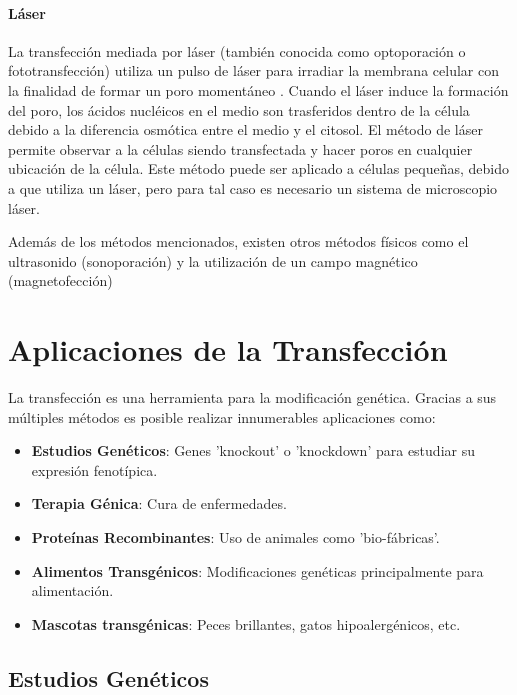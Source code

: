 \documentclass[fleqn,10pt]{SelfArx} %
\begin{document}
\paragraph*{Láser}
La transfección mediada por láser (también conocida como optoporación o fototransfección) utiliza un pulso de láser para irradiar la membrana celular con la finalidad de formar un poro momentáneo \cite{Shirahata:2001aa, Barrett:2006aa}. Cuando el láser induce la formación del poro, los ácidos nucléicos en el medio son trasferidos dentro de la célula debido a la diferencia osmótica entre el medio y el citosol. El método de láser permite observar a la células siendo transfectada y hacer poros en cualquier ubicación de la célula. Este método puede ser aplicado a células pequeñas, debido a que utiliza un láser, pero para tal caso es necesario un sistema de microscopio láser. 

Además de los métodos mencionados, existen otros métodos físicos como el ultrasonido (sonoporación) y la utilización de un campo magnético (magnetofección) \cite{Kim:1996aa, Dobson:2006aa, Scherer:2002aa}

\section{Aplicaciones de la Transfección}

La transfección es una herramienta para la modificación genética. Gracias a sus múltiples métodos es posible realizar innumerables aplicaciones como:
\begin{itemize}[noitemsep] %
\item \textbf{Estudios Genéticos}: Genes 'knockout' o 'knockdown' para estudiar su expresión fenotípica.
\item \textbf{Terapia Génica}: Cura de enfermedades.
\item \textbf{Proteínas Recombinantes}: Uso de animales como 'bio-fábricas'.
\item \textbf{Alimentos Transgénicos}: Modificaciones genéticas principalmente para alimentación.
\item \textbf{Mascotas transgénicas}: Peces brillantes, gatos hipoalergénicos, etc.
\end{itemize}

\subsection{Estudios Genéticos}
\end{document}
